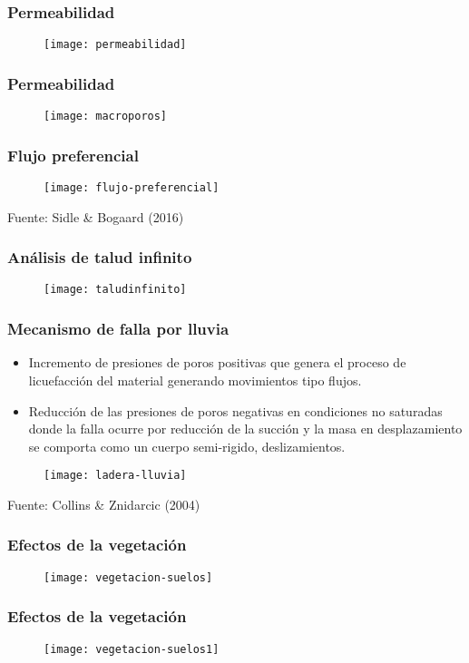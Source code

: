 \documentclass[12pt]{beamer}
\begin{document}
\begin{frame}
\frametitle{Permeabilidad}
\begin{figure}
\centering
\texttt{[image: permeabilidad]}
\end{figure}
\end{frame}
\begin{frame}
\frametitle{Permeabilidad}
\begin{figure}
\centering
\texttt{[image: macroporos]}
\end{figure}
\end{frame}
\begin{frame}
\frametitle{Flujo preferencial}
\begin{figure}
\centering
\texttt{[image: flujo-preferencial]}
\end{figure}
\tiny{Fuente: Sidle \& Bogaard (2016)}
\end{frame}
\begin{frame}
\frametitle{Análisis de talud infinito}
\begin{figure}
\centering
\texttt{[image: taludinfinito]}
\end{figure}
\end{frame}
\begin{frame}
\frametitle{Mecanismo de falla por lluvia}
\scriptsize{
\begin{itemize}
\item Incremento de presiones de poros positivas que genera el proceso de licuefacción del material generando movimientos tipo flujos.
\item Reducción de las presiones de poros negativas en condiciones no saturadas donde la falla ocurre por reducción de la succión y la masa en desplazamiento se comporta como un cuerpo semi-rigido, deslizamientos.
\end{itemize}
}
\begin{figure}
\centering
\texttt{[image: ladera-lluvia]}
\end{figure}
\tiny{Fuente: Collins \& Znidarcic (2004)}
\end{frame}
\begin{frame}
\frametitle{Efectos de la vegetación}
\begin{figure}
\centering
\texttt{[image: vegetacion-suelos]}
\end{figure}
\end{frame}
\begin{frame}
\frametitle{Efectos de la vegetación}
\begin{figure}
\centering
\texttt{[image: vegetacion-suelos1]}
\end{figure}
\end{frame}
\end{document}
